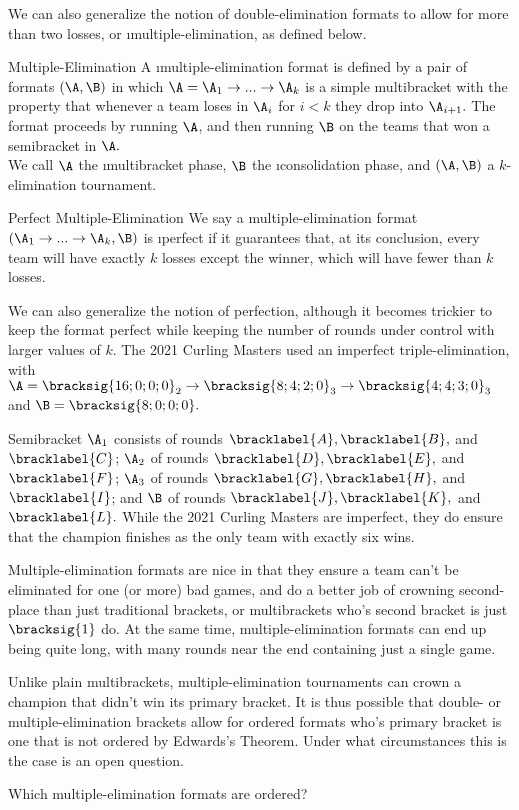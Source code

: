 {    We can also generalize the notion of double-elimination formats to allow for more than two losses, or \i{multiple-elimination}, as defined below.

    \begin{definition}{Multiple-Elimination}{}
        A \i{multiple-elimination format} is defined by a pair of formats $(\A, \B)$ in which $\A = \A_1 \to ... \to \A_k$ is a simple multibracket with the property that whenever a team loses in $\A_i$ for $i < k$ they drop into $\A_{i+1}.$ The format proceeds by running $\A$, and then running $\B$ on the teams that won a semibracket in $\A.$\\
        
        We call $\A$ the \i{multibracket phase}, $\B$ the \i{consolidation phase}, and $(\A, \B)$ a $k$-elimination tournament.
   \end{definition}

   \begin{definition}{Perfect Multiple-Elimination}{}
        We say a multiple-elimination format $(\A_1 \to ... \to \A_k, \B)$ is \i{perfect} if it guarantees that, at its conclusion, every team will have exactly $k$ losses except the winner, which will have fewer than $k$ losses.
    \end{definition}

    We can also generalize the notion of perfection, although it becomes trickier to keep the format perfect while keeping the number of rounds under control with larger values of $k$. The 2021 Curling Masters used an imperfect triple-elimination, with $\A = \bracksig{16;0;0;0}_2 \to \bracksig{8;4;2;0}_3 \to \bracksig{4;4;3;0}_3$ and $\B = \bracksig{8;0;0;0}.$


    Semibracket $\A_1$ consists of rounds $\bracklabel{A}, \bracklabel{B},$ and $\bracklabel{C}$; $\A_2$ of rounds $\bracklabel{D}, \bracklabel{E},$ and $\bracklabel{F}$; $\A_3$ of rounds $\bracklabel{G}, \bracklabel{H},$ and $\bracklabel{I}$; and $\B$ of rounds $\bracklabel{J}, \bracklabel{K},$ and $\bracklabel{L}.$ While the 2021 Curling Masters are imperfect, they do ensure that the champion finishes as the only team with exactly six wins.

    Multiple-elimination formats are nice in that they ensure a team can't be eliminated for one (or more) bad games, and do a better job of crowning second-place than just traditional brackets, or multibrackets who's second bracket is just $\bracksig{1}$ do. At the same time, multiple-elimination formats can end up being quite long, with many rounds near the end containing just a single game.

    Unlike plain multibrackets, multiple-elimination tournaments can crown a champion that didn't win its primary bracket. It is thus possible that double- or multiple-elimination brackets allow for ordered formats who's primary bracket is one that is not ordered by Edwards's Theorem. Under what circumstances this is the case is an open question.

    \begin{oq}{}{}
        Which multiple-elimination formats are ordered?
    \end{oq}
}